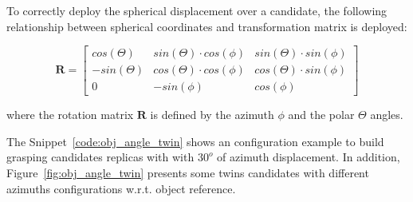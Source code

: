 \begin{figure}[h!]
\end{figure}

To correctly deploy the spherical displacement over a candidate, the following relationship between spherical coordinates and transformation matrix is deployed:

\begin{equation}
	\mathbf{R}=\begin{bmatrix}
		cos(\Theta) & sin(\Theta)\cdot cos(\phi) & sin(\Theta)\cdot sin(\phi) \\
		-sin(\Theta)& cos(\Theta)\cdot cos(\phi)& cos(\Theta)\cdot sin(\phi) \\
		0 & -sin(\phi) & cos(\phi)
	\end{bmatrix}
	\label{eq:rotation_obj_twin}
\end{equation}

\noindent where the rotation matrix $\mathbf{R}$ is defined by the azimuth $\phi$ and the polar $\Theta$ angles. 

The Snippet~\ref{code:obj_angle_twin} shows an configuration example to build grasping candidates replicas with with $30^o$ of azimuth displacement. In addition, Figure~\ref{fig:obj_angle_twin} presents some twins candidates with different azimuths configurations w.r.t. object reference.


